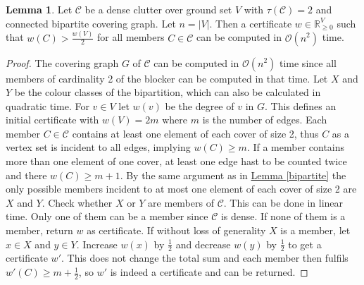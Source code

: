 \documentclass[a4paper, 12pt]{scrbook}
\theoremstyle{definition}
\newtheorem{lemma}[theorem]{Lemma}
\newcommand*{\IR}{\ensuremath{\mathbb{R}}}
\begin{document}
   \begin{lemma}\label{computecert}
       Let $\mathcal{C}$ be a dense clutter over ground set $V$ with $\tau(\mathcal{C})=2$ and connected bipartite covering graph. Let $n=|V|$. Then a certificate $w \in \IR^V_{\geq 0}$ such that $w(C)>\frac{w(V)}{2}$ for all members $C \in \mathcal{C}$ can be computed in $\mathcal{O}(n^2)$ time.
   \end{lemma}

   \begin{proof}
       The covering graph $G$ of $\mathcal{C}$ can be computed in $\mathcal{O}(n^2)$ time since all members of cardinality 2 of the blocker can be computed in that time.
       Let $X$ and $Y$ be the colour classes of the bipartition, which can also be calculated in quadratic time.
       For $v \in V$ let $w(v)$ be the degree of $v$ in $G$. This defines an initial certificate with $w(V) = 2m$ where $m$ is the number of edges.
       Each member $C \in \mathcal{C}$ contains at least one element of each cover of size 2, thus $C$ as a vertex set is incident to all edges, implying $w(C) \geq m$.
       If a member contains more than one element of one cover, at least one edge hast to be counted twice and there $w(C) \geq m+1$.
       By the same argument as in \hyperref[bipartite]{Lemma \ref*{bipartite}} the only possible members incident to at most one element of each cover of size 2 are $X$ and $Y$.
       Check whether $X$ or $Y$ are members of $\mathcal{C}$. This can be done in linear time.
       Only one of them can be a member since $\mathcal{C}$ is dense.
       If none of them is a member, return $w$ as certificate.
       If without loss of generality $X$ is a member, let $x \in X$ and $y \in Y$.
       Increase $w(x)$ by $\frac 12$ and decrease $w(y)$ by $\frac 12$ to get a certificate $w'$.
       This does not change the total sum and each member then fulfils $w'(C) \geq m + \frac 12$, so $w'$ is indeed a certificate and can be returned.
   \end{proof}
\end{document}
